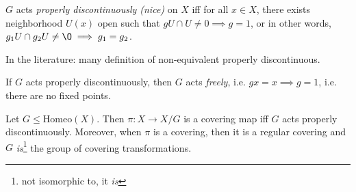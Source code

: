 \begin{definition}
    $G$ acts \emph{properly discontinuously (nice)} on $X$ iff for all $x \in X$, there exists neighborhood $U(x)$ open such that $g U \cap U \neq 0 \implies g = 1$, or in other words, $g_1U \cap  g_2 U \neq \O \implies g_1 = g_2$.
\end{definition}
\begin{remark}
    In the literature: many definition of non-equivalent properly discontinuous.
\end{remark}
\begin{remark}
    If $G$ acts properly discontinuously, then $G$ acts \emph{freely}, i.e. $gx = x \implies g = 1$, i.e. there are no fixed points.
\end{remark}
\begin{theorem}[76.5, important!]
    Let $G \le  \text{Homeo}(X)$.
    Then $\pi: X \to X / G$ is a covering map iff $G$ acts properly discontinuously.
    Moreover, when $\pi$ is a covering, then it is a regular covering and $G$ \emph{is}\footnote{not isomorphic to, it \emph{is}} the group of covering transformations.
\end{theorem}
